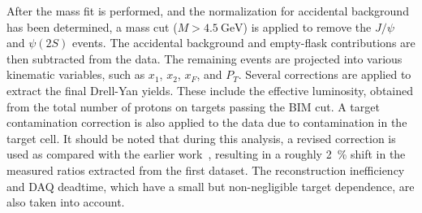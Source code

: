 \documentclass[reprint,aps,unsortedaddress,superscriptaddress,prl,floatfix,showpacs,linenumbers,final]{revtex4-2}
\begin{document}
After the mass fit is performed, and the normalization for accidental background has been determined,
a mass cut ($M>\SI{4.5}{\GeV}$) is applied to remove the $J/\psi$ and $\psi\left(2S\right)$ events.
The accidental background and empty-flask contributions are then subtracted from the data.
The remaining events are projected into various kinematic variables, such as $x_1$, $x_2$, $x_F$, and $P_T$.
Several corrections are applied to extract the final Drell-Yan yields.
These include the effective luminosity, obtained from the total number of protons on targets passing the BIM cut.
A target contamination correction is also applied to the  data due to  contamination in the target cell.
It should be noted that during this analysis,
a revised correction is used as compared with the earlier work~\cite{dove2021,dove2023},
resulting in a roughly \SI{2}{\percent} shift in the measured ratios extracted from the first dataset.
The reconstruction inefficiency and DAQ deadtime, which have a small but non-negligible target dependence,
are also taken into account.
\end{document}

